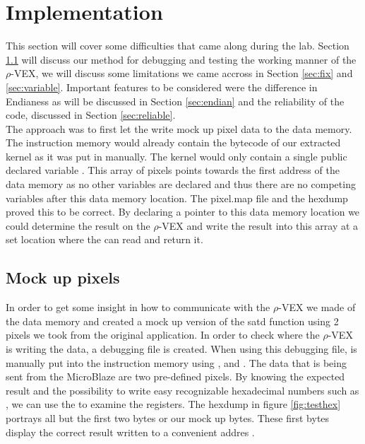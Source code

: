 \section{Implementation}
This section will cover some difficulties that came along during the lab. Section \ref{sec:debugging} will discuss our method for debugging and testing the working manner of the $\rho$-VEX, we will discuss some limitations we came accross in Section \ref{sec:fix} and \ref{sec:variable}. Important features to be considered were the difference in Endianess as will be discussed in Section \ref{sec:endian} and the reliability of the code, discussed in Section \ref{sec:reliable}.\\

The approach was to first let the  write mock up pixel data to the data memory. The instruction memory would already contain the bytecode of our extracted kernel as it was put in manually. The kernel would only contain a single public declared variable . This array of pixels points towards the first address of the data memory as no other variables are declared and thus there are no competing variables after this data memory location. The pixel.map file and the hexdump proved this to be correct. By declaring a pointer to this data memory location we could determine the result on the $\rho$-VEX and write the result into this array at a set location where the  can read and return it. 

\subsection{Mock up pixels}
\label{sec:debugging}
In order to get some insight in how to communicate with the $\rho$-VEX we made  of the data memory and created a mock up version of the satd function using 2 pixels we took from the original application. In order to check where the $\rho$-VEX is writing the data, a debugging file  is created. When using this debugging file,  is manually put into the instruction memory using ,  and . The data that is being sent from the MicroBlaze are two pre-defined pixels. By knowing the expected result and the possibility to write easy recognizable hexadecimal numbers such as , we can use the  to examine the registers. The  hexdump in figure \ref{fig:testhex} portrays all but the first two bytes or our mock up bytes. These first bytes display the correct result written to a convenient addres .

